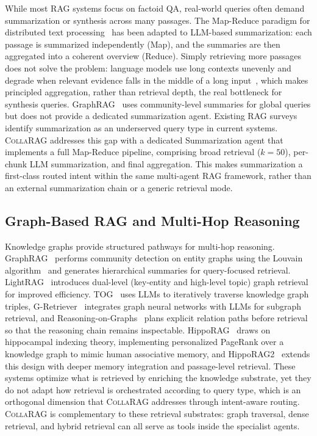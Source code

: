 \documentclass[11pt,a4paper]{article}
\newcommand{\sys}{\textsc{CollaRAG}}
\begin{document}
While most RAG systems focus on factoid QA, real-world queries often demand summarization or synthesis across many passages.
The Map-Reduce paradigm for distributed text processing~\citep{dean2008mapreduce} has been adapted to LLM-based summarization: each passage is summarized independently (Map), and the summaries are then aggregated into a coherent overview (Reduce).
Simply retrieving more passages does not solve the problem: language models use long contexts unevenly and degrade when relevant evidence falls in the middle of a long input~\citep{liu2024lostmiddle}, which makes principled aggregation, rather than retrieval depth, the real bottleneck for synthesis queries.
GraphRAG~\citep{edge2024graphrag} uses community-level summaries for global queries but does not provide a dedicated summarization agent.
Existing RAG surveys~\citep{gao2024rag_survey, zhao2024retrieval} identify summarization as an underserved query type in current systems.
\sys{} addresses this gap with a dedicated Summarization agent that implements a full Map-Reduce pipeline, comprising broad retrieval ($k\!=\!50$), per-chunk LLM summarization, and final aggregation.
This makes summarization a first-class routed intent within the same multi-agent RAG framework, rather than an external summarization chain or a generic retrieval mode.

\subsection{Graph-Based RAG and Multi-Hop Reasoning}

Knowledge graphs provide structured pathways for multi-hop reasoning.
GraphRAG~\citep{edge2024graphrag} performs community detection on entity graphs using the Louvain algorithm~\citep{blondel2008louvain} and generates hierarchical summaries for query-focused retrieval.
LightRAG~\citep{guo2024lightrag} introduces dual-level (key-entity and high-level topic) graph retrieval for improved efficiency.
TOG~\citep{sun2024tog} uses LLMs to iteratively traverse knowledge graph triples, G-Retriever~\citep{he2024gretriever} integrates graph neural networks with LLMs for subgraph retrieval, and Reasoning-on-Graphs~\citep{luo2024rog} plans explicit relation paths before retrieval so that the reasoning chain remains inspectable.
HippoRAG~\citep{gutierrez2024hipporag} draws on hippocampal indexing theory, implementing personalized PageRank over a knowledge graph to mimic human associative memory, and HippoRAG2~\citep{gutierrez2025hipporag2} extends this design with deeper memory integration and passage-level retrieval.
These systems optimize what is retrieved by enriching the knowledge substrate, yet they do not adapt how retrieval is orchestrated according to query type, which is an orthogonal dimension that \sys{} addresses through intent-aware routing.
\sys{} is complementary to these retrieval substrates: graph traversal, dense retrieval, and hybrid retrieval can all serve as tools inside the specialist agents.
\end{document}
